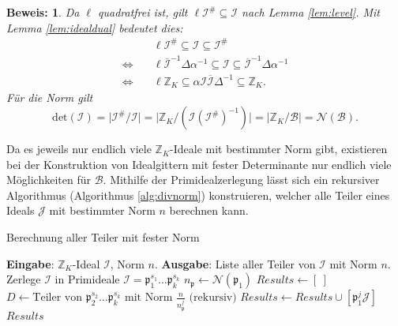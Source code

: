 \documentclass[12pt,a4paper,halfparskip,headsepline,bibtotocnumbered]{scrreprt}
\theoremstyle{nummermitklammern}
\theoremstyle{nonumberbreak}
\newtheorem{beweis}{Beweis:}
\newcommand{\Z}{\mathbb{Z}}
\newcommand{\B}{\mathcal{B}}
\newcommand{\No}{\mathcal{N}}
\newcommand{\I}{\mathcal{I}}
\newcommand{\J}{\mathcal{J}}
\newcommand{\p}{\mathfrak{p}}
\begin{document}
\begin{beweis}
	Da $\ell$ quadratfrei ist, gilt $\ell \I^\# \subseteq \I$ nach Lemma \eqref{lem:level}. Mit Lemma \eqref{lem:idealdual} bedeutet dies:
	\begin{align*}
		&\ell \I^\# \subseteq \I \subseteq \I^\#\\
		\Leftrightarrow\quad& \ell \overline{\I}^{-1} \Delta \alpha^{-1} \subseteq \I \subseteq \overline{\I}^{-1} \Delta \alpha^{-1}\\
		\Leftrightarrow\quad& \ell \Z_K \subseteq \alpha \I \overline{\I} \Delta^{-1} \subseteq \Z_K.
	\end{align*}
	Für die Norm gilt
	\begin{equation*}
		\text{det}(\I) = \vert \I^\# / \I \vert = \vert \Z_K / \left(\I\left(\I^\#\right)^{-1}\right) \vert = \vert \Z_K / \B \vert = \No(\B).
	\end{equation*}
\end{beweis}

Da es jeweils nur endlich viele $\Z_K$-Ideale mit bestimmter Norm gibt, existieren bei der Konstruktion von Idealgittern mit fester Determinante nur endlich viele Möglichkeiten für $\B$. Mithilfe der Primidealzerlegung lässt sich ein rekursiver Algorithmus (Algorithmus \eqref{alg:divnorm}) konstruieren, welcher alle Teiler eines Ideals $\J$ mit bestimmter Norm $n$ berechnen kann.

\begin{algorithm}
	\caption{Berechnung aller Teiler mit fester Norm}\label{alg:divnorm}
	\begin{algorithmic}[1]
		\State \textbf{Eingabe}: $\Z_K$-Ideal $\I$, Norm $n$.
		\State \textbf{Ausgabe}: Liste aller Teiler von $\I$ mit Norm $n$.
		\\
		 \Return {$\left[ \Z_K \right]$} \EndIf
		\If {$n \nmid \No(\I))$} \Return {$\left[ \ \right]$} \EndIf
		\If {$\No(\I) = n$} \Return {$\left[ \I \right]$} \EndIf
		\State Zerlege $\I$ in Primideale $\I = \p_1^{s_1} \dots \p_k^{s_k}$
		\State $n_\p \gets \No(\p_1)$
		\State $Results \gets \left[ \ \right]$
			\If {$n_\p^j \mid n$}
				\State $D \gets \text{Teiler von } \p_2^{s_2} \dots \p_k^{s_k} \text{ mit Norm } \frac{n}{n_\p^j} \text{ (rekursiv)}$
				\For {$\J \in D$}
					\State $Results \gets Results \cup \left[\p_1^j \J \right]$
				\EndFor
			\EndIf
		\EndFor
		\State \Return $Results$
	\end{algorithmic}
\end{algorithm}
\end{document}
